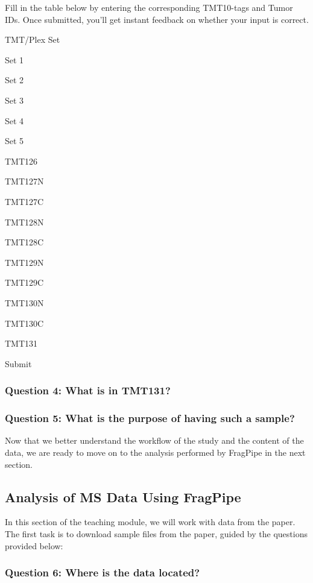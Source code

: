 \documentclass[
  letterpaper,
  DIV=11,
  numbers=noendperiod]{scrartcl}
\begin{document}
Fill in the table below by entering the corresponding TMT10-tags and
Tumor IDs. Once submitted, you'll get instant feedback on whether your
input is correct.

TMT/Plex Set

Set 1

Set 2

Set 3

Set 4

Set 5

TMT126

TMT127N

TMT127C

TMT128N

TMT128C

TMT129N

TMT129C

TMT130N

TMT130C

TMT131

Submit

\subsubsection{Question 4: What is in
TMT131?}\label{question-4-what-is-in-tmt131}

\subsubsection{Question 5: What is the purpose of having such a
sample?}\label{question-5-what-is-the-purpose-of-having-such-a-sample}

Now that we better understand the workflow of the study and the content
of the data, we are ready to move on to the analysis performed by
FragPipe in the next section.

\subsection{Analysis of MS Data Using
FragPipe}\label{analysis-of-ms-data-using-fragpipe}

In this section of the teaching module, we will work with data from the
paper. The first task is to download sample files from the paper, guided
by the questions provided below:

\subsubsection{Question 6: Where is the data
located?}\label{question-6-where-is-the-data-located}
\end{document}
